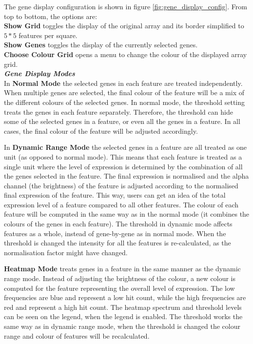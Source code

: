\documentclass[10pt,a4paper,titlepage]{book}
\begin{document}
The gene display configuration is shown in figure \ref{fig:gene_display_config}. From top to bottom, the options are:\\
\textbf{Show Grid} toggles the display of the original array and its border simplified to $5*5$ features per square.\\
\textbf{Show Genes} toggles the display of the currently selected genes.\\
\textbf{Choose Colour Grid} opens a menu to change the colour of the displayed array grid.\\


\textbf{\textit{Gene Display Modes}}\\


In \textbf{Normal Mode} the selected genes in each feature are treated independently. When multiple genes are selected, the final colour of the feature will be a mix of the different colours of the selected genes. In normal mode, the threshold setting treats the genes in each feature separately. Therefore, the threshold can hide some of the selected genes in a feature, or even all the genes in a feature. In all cases, the final colour of the feature will be adjusted accordingly.

In \textbf{Dynamic Range Mode} the selected genes in a feature are all treated as one unit (as opposed to normal mode). This means that each feature is treated as a single unit where the level of expression is determined by the combination of all the genes selected in the feature. The final expression is normalised and the alpha channel (the brightness) of the feature is adjusted according  to the normalised final expression of the feature. This way, users can get an idea of the total expression level of a feature compared to all other features. The colour of each feature will be computed in the same way as in the normal mode (it combines the colours of the genes in each feature).
The threshold in dynamic mode affects features as a whole, instead of gene-by-gene as in normal mode. When the threshold is changed the intensity for all the features is re-calculated, as the normalisation factor might have changed.

\textbf{Heatmap Mode} treats genes in a feature in the same manner as the dynamic range mode. Instead of adjusting the brightness of the colour, a new colour is computed for the feature representing the overall level of expression. The low frequencies are blue and represent a low hit count, while the high frequencies are red and represent a high hit count. The heatmap spectrum and threshold levels can be seen on the legend, when the legend is enabled.
The threshold works the same way as in dynamic range mode, when the threshold is changed the colour range and colour of features will be recalculated.
\end{document}
